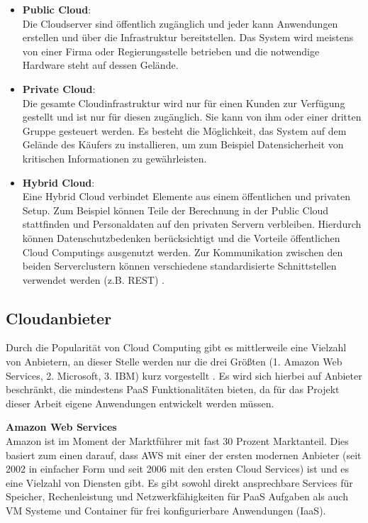 \begin{itemize}
	\item \textbf{Public Cloud}:\\
	Die Cloudserver sind öffentlich zugänglich und jeder kann Anwendungen erstellen und über die Infrastruktur bereitstellen. Das System wird meistens von einer Firma oder Regierungsstelle betrieben und die notwendige Hardware steht auf dessen Gelände. 
	\item \textbf{Private Cloud}:\\
	Die gesamte Cloudinfrastruktur wird nur für einen Kunden zur Verfügung gestellt und ist nur für diesen zugänglich. Sie kann von ihm oder einer dritten Gruppe gesteuert werden. Es besteht die Möglichkeit, das System auf dem Gelände des Käufers zu installieren, um zum Beispiel Datensicherheit von kritischen Informationen zu gewährleisten. 
	\item \textbf{Hybrid Cloud}:\\
	Eine Hybrid Cloud verbindet Elemente aus einem öffentlichen und privaten Setup. Zum Beispiel können Teile der Berechnung in der Public Cloud stattfinden und Personaldaten auf den privaten Servern verbleiben. Hierdurch können Datenschutzbedenken berücksichtigt und die Vorteile öffentlichen Cloud Computings ausgenutzt werden. Zur Kommunikation zwischen den beiden Serverclustern können verschiedene standardisierte Schnittstellen verwendet werden (z.B. REST)  \parencite{rafaels.2015}.
\end{itemize}

\subsection{Cloudanbieter} \label{subsec:cloudprovider}
Durch die Popularität von Cloud Computing gibt es mittlerweile eine Vielzahl von Anbietern, an dieser Stelle werden nur die drei Größten (1. Amazon Web Services, 2. Microsoft, 3. IBM) kurz vorgestellt \parencite{statistia.2016}. Es wird sich hierbei auf Anbieter beschränkt, die mindestens \acs{PaaS} Funktionalitäten bieten, da für das Projekt dieser Arbeit eigene Anwendungen entwickelt werden müssen.


\textbf{Amazon Web Services}\\
Amazon ist im Moment der Marktführer mit fast 30 Prozent Marktanteil. Dies basiert zum einen darauf, dass \ac{AWS} mit einer der ersten modernen Anbieter (seit 2002 in einfacher Form und seit 2006 mit den ersten Cloud Services) ist und es eine Vielzahl von Diensten gibt. Es gibt sowohl direkt ansprechbare Services für Speicher, Rechenleistung und Netzwerkfähigkeiten für \acs{PaaS} Aufgaben als auch VM Systeme und Container für frei konfigurierbare Anwendungen (\acs{IaaS}).

